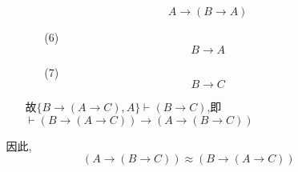 \documentclass[11pt,oneside,a4paper]{article}
\begin{document}
\begin{itemize}
\begin{itemize}
\begin{itemize}
\begin{enumerate}
                                \begin{equation*}
                                        A \to (B \to A)         \tag*{L1}
                                \end{equation*}
                        \item[(6)]
                                \begin{equation*}
                                        B \to A         \tag*{MP(4,5)}
                                \end{equation*}
                        \item[(7)]
                                \begin{equation*}
                                        B \to C         \tag*{MP(3,6)}
                                \end{equation*}                               
                    \end{enumerate}
                    故$\{B \to (A \to C),A\} \vdash (B \to C)$,即$\vdash  (B \to (A \to C)) \to (A \to (B \to C))$   
            \end{itemize}
            因此,\[(A \to (B \to C)) \approx (B \to (A \to C))\]


\end{itemize}
\end{itemize}
\end{document}

